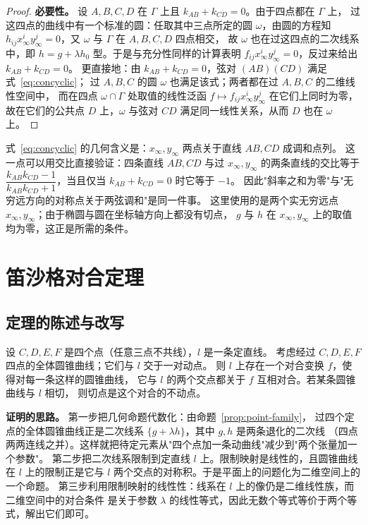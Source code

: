\begin{proof}
\textbf{必要性。} 设 $A,B,C,D$ 在 $\Gamma$ 上且 $k_{AB}+k_{CD}=0$。由于四点都在 $\Gamma$ 上，
过这四点的曲线中有一个标准的圆：任取其中三点所定的圆 $\omega$，由圆的方程知
$h_{ij}x_\infty^iy_\infty^j=0$，又 $\omega$ 与 $\Gamma$ 在 $A,B,C,D$ 四点相交，
故 $\omega$ 也在过这四点的二次线系中，即 $h=g+\lambda h_0$ 型。于是与充分性同样的计算表明
$f_{ij}x_\infty^iy_\infty^j=0$，反过来给出 $k_{AB}+k_{CD}=0$。
更直接地：由 $k_{AB}+k_{CD}=0$，弦对 $(AB)(CD)$ 满足式~\eqref{eq:concyclic}；
过 $A,B,C$ 的圆 $\omega$ 也满足该式；两者都在过 $A,B,C$ 的二维线性空间中，
而在四点 $\omega\cap\Gamma$ 处取值的线性泛函
$f\mapsto f_{ij}x_\infty^iy_\infty^j$ 在它们上同时为零，
故在它们的公共点 $D$ 上，$\omega$ 与弦对 $CD$ 满足同一线性关系，从而 $D$ 也在 $\omega$ 上。
\end{proof}

\begin{remark}
式~\eqref{eq:concyclic} 的几何含义是：$x_\infty,y_\infty$ 两点关于直线 $AB,CD$ 成调和点列。
这一点可以用交比直接验证：四条直线 $AB,CD$ 与过 $x_\infty,y_\infty$ 的两条直线的交比等于
$\dfrac{k_{AB}k_{CD}-1}{k_{AB}k_{CD}+1}$，当且仅当 $k_{AB}+k_{CD}=0$ 时它等于 $-1$。
因此"斜率之和为零"与"无穷远方向的对称点关于两弦调和"是同一件事。
这里使用的是两个实无穷远点 $x_\infty,y_\infty$；由于椭圆与圆在坐标轴方向上都没有切点，
$g$ 与 $h$ 在 $x_\infty,y_\infty$ 上的取值均为零，这正是所需的条件。
\end{remark}

\section{笛沙格对合定理}

\subsection{定理的陈述与改写}

\begin{theorem}[笛沙格对合定理]\label{thm:desargues}
设 $C,D,E,F$ 是四个点（任意三点不共线），$l$ 是一条定直线。
考虑经过 $C,D,E,F$ 四点的全体圆锥曲线；它们与 $l$ 交于一对动点。
则 $l$ 上存在一个对合变换 $f$，使得对每一条这样的圆锥曲线，
它与 $l$ 的两个交点都关于 $f$ 互相对合。若某条圆锥曲线与 $l$ 相切，
则切点是这个对合的不动点。
\end{theorem}

\textbf{证明的思路。} 第一步把几何命题代数化：由命题~\ref{prop:point-family}，
过四个定点的全体圆锥曲线正是二次线系 $\{g+\lambda h\}$，其中 $g,h$ 是两条退化的二次线
（四点两两连线之并）。这样就把待定元素从"四个点加一条动曲线"减少到"两个张量加一个参数"。
第二步把二次线系限制到定直线 $l$ 上。限制映射是线性的，且圆锥曲线在 $l$ 上的限制正是它与 $l$
两个交点的对称积。于是平面上的问题化为二维空间上的一个命题。
第三步利用限制映射的线性性：线系在 $l$ 上的像仍是二维线性族，而二维空间中的对合条件
是关于参数 $\lambda$ 的线性等式，因此无数个等式等价于两个等式，解出它们即可。

